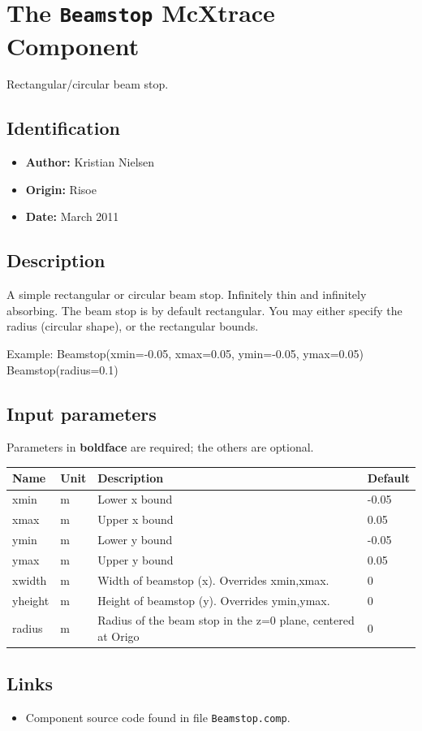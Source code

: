 \section{The \texttt{Beamstop} McXtrace Component}
Rectangular/circular beam stop.

\subsection*{Identification}
\begin{itemize}
  \item \textbf{Author:} Kristian Nielsen
  \item \textbf{Origin:} Risoe
  \item \textbf{Date:} March 2011
\end{itemize}

\subsection*{Description}
A simple rectangular or circular beam stop. Infinitely thin and infinitely absorbing. The beam stop is by default rectangular. You may either specify the radius (circular shape), or the rectangular bounds.

Example: Beamstop(xmin=-0.05, xmax=0.05, ymin=-0.05, ymax=0.05) Beamstop(radius=0.1)

\subsection*{Input parameters}
Parameters in \textbf{boldface} are required; the others are optional.

\begin{longtable}{p{}p{}p{}p{}}
\toprule
\textbf{Name} & \textbf{Unit} & \textbf{Description} & \textbf{Default} \\
\midrule
\endhead
xmin & m & Lower x bound & -0.05 \\
xmax & m & Upper x bound & 0.05 \\
ymin & m & Lower y bound & -0.05 \\
ymax & m & Upper y bound & 0.05 \\
xwidth & m & Width of beamstop (x). Overrides xmin,xmax. & 0 \\
yheight & m & Height of beamstop (y). Overrides ymin,ymax. & 0 \\
radius & m & Radius of the beam stop in the z=0 plane, centered at Origo & 0 \\
\bottomrule
\end{longtable}

\subsection*{Links}
\begin{itemize}
  \item Component source code found in file \texttt{Beamstop.comp}.
\end{itemize}
